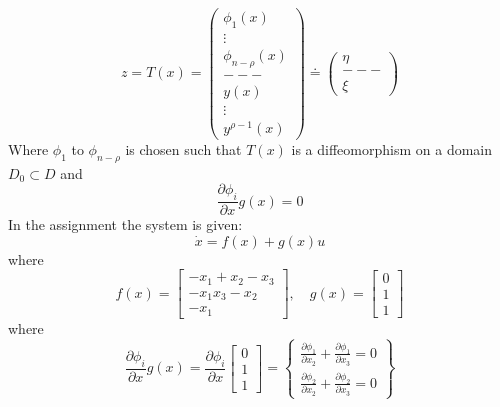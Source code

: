\begin{equation}
        z = T(x) = 
        \begin{pmatrix}
                \phi_1(x) \\
                \vdots \\
                \phi_{n - \rho}(x) \\
                --- \\
                y(x) \\
                \vdots \\
                y^{\rho - 1}(x)
        \end{pmatrix}
        \doteq
        \begin{pmatrix}
                \eta \\
                --- \\
                \xi
        \end{pmatrix}
\end{equation}
Where $\phi_1$ to $\phi_{n - \rho}$ is chosen such that $T(x)$ is a diffeomorphism on a domain $D_0 \subset D$ and 
\begin{equation}
        \frac{\partial \phi_{i}}{\partial x}g(x) = 0
\end{equation}
In the assignment the system is given:
\begin{equation}
        \dot{x} = f(x) + g(x)u
\end{equation}
where 
\begin{equation}
        f(x) = 
        \begin{bmatrix}
                -x_1 + x_2 - x_3 \\
                -x_1 x_3 - x_2 \\
                -x_1
        \end{bmatrix}
        ,\quad 
        g(x) = 
        \begin{bmatrix}
                0 \\
                1 \\
                1
        \end{bmatrix}
\end{equation}
where 
\begin{equation}
        \frac{\partial \phi_{i}}{\partial x}g(x) = \frac{\partial \phi_{i}}{\partial x} 
        \begin{bmatrix}
                0 \\
                1 \\
                1
        \end{bmatrix}
        =
        \begin{Bmatrix}
                \frac{\partial \phi_{1}}{\partial x_2} + \frac{\partial \phi_{1}}{\partial x_{3}} = 0 \\
                \frac{\partial \phi_{2}}{\partial x_2} + \frac{\partial \phi_{2}}{\partial x_{3}} = 0
        \end{Bmatrix}
\end{equation}
